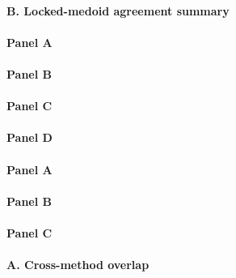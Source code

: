 

\paragraph*{B. Locked-medoid agreement summary}



\paragraph*{Panel A}



\paragraph*{Panel B}



\paragraph*{Panel C}



\paragraph*{Panel D}



\paragraph*{Panel A}



\paragraph*{Panel B}



\paragraph*{Panel C}



\paragraph*{A. Cross-method overlap}

